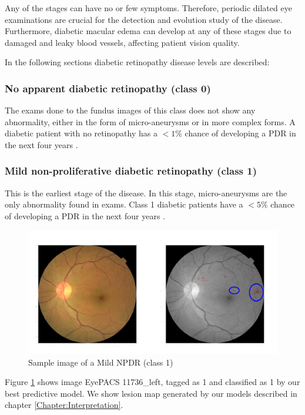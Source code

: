 Any of the stages can have no or few symptoms. Therefore, periodic dilated eye examinations are crucial for the detection and evolution study of the disease. Furthermore, diabetic macular edema can develop at any of these stages due to damaged and leaky blood vessels, affecting patient vision quality.

In the following sections diabetic retinopathy disease levels \citep{diaclass} are described:


\subsubsection*{No apparent diabetic retinopathy (class 0)}

The exams done to the fundus images of this class does not show any abnormality, either in the form of micro-aneurysms or in more complex forms. A diabetic patient with no retinopathy has a $<1\%$ chance of developing a PDR in the next four years \citep{klein2009wisconsin}.

\subsubsection*{Mild non-proliferative diabetic retinopathy (class 1)}

This is the earliest stage of the disease. In this stage, micro-aneurysms are the only abnormality found in exams. Class 1 diabetic patients have a $<5\%$ chance of developing a PDR in the next four years \citep{klein2009wisconsin}.

\begin{figure}[ht!]
	\centering
	\includegraphics[width=\textwidth]{Figures/chapter_background/classes/class1.png}
	\caption{Sample image of a Mild NPDR (class 1)} 
	\label{back:fig:class1_sample} 
\end{figure}

Figure \ref{back:fig:class1_sample} shows image EyePACS 11736\_left, tagged as 1 and classified as 1 by our best predictive model. We show lesion map generated by our models described in chapter \ref{Chapter:Interpretation}.

